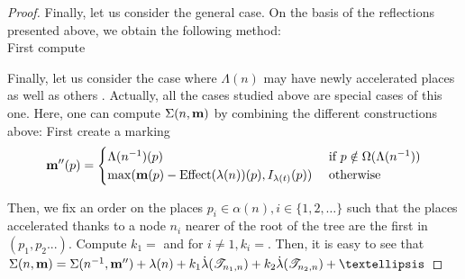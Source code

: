 \begin{proof}





  Finally, let us consider the general case.
  On the basis of the reflections presented above, we obtain the following method:\\
  First compute


  Finally, let us consider the case where $\Lambda(n)$ may have newly accelerated places as well as others \oplaces.
  Actually, all the cases studied above are special cases of this one.
  Here, one can compute $\Sigma(n, \mathbf{m})$ by combining the different constructions above:
  First create a marking
  \[
    \mathbf{m''}(p) = \begin{cases}
      \Lambda(n^{-1})(p)
        &\text{ if } p \notin \Omega(\Lambda(n^{-1})) \\
      \max(\mathbf{m}(p) - \operatorname{Effect}(\lambda(n))(p), I_{\lambda(t)}(p))
        &\text{ otherwise}
    \end{cases}
  \]

  Then, we fix an order on the places $p_i \in \alpha(n), i \in \{1, 2,…\}$ such that the places accelerated thanks to a node $n_i$ nearer of the root of the tree are the first in $(p_1, p_2...)$.
  Compute $k_1 = $ \todo{} and for $i \neq 1, k_i = $\todo{}.
  Then, it is easy to see that $\Sigma(n, \mar) = \Sigma(\parent{n}, \marpp) + \lambda(n) + k_1 \dot \lambda(\treepath{n_1,n}) + k_2 \dot \lambda(\treepath{n_2,n}) + …$
\end{proof}

